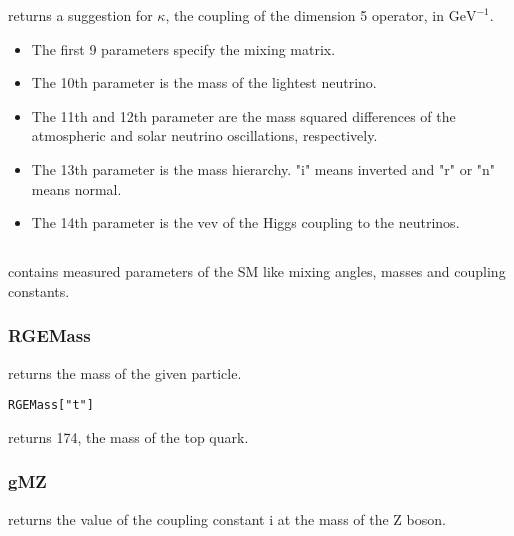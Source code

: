 \documentclass[10pt,a4paper,twoside]{scrartcl}
\begin{document}
 returns a suggestion for
    $\kappa$, the coupling of the dimension 5 operator, in
$\mathrm{GeV}^{-1}$.
\begin{itemize}
\item The first 9 parameters specify the mixing matrix.
\item The 10th parameter is the mass of the lightest neutrino.
\item The 11th and 12th parameter are the mass squared differences of the
atmospheric and solar neutrino oscillations, respectively.
\item The 13th parameter is the mass hierarchy. "i" means inverted and "r" or
"n" means normal.
\item The 14th parameter is the vev of the Higgs coupling
to the neutrinos.
\end{itemize}





\subsection[\package{RGEParameters}]{}
 contains measured parameters of the SM like mixing
angles, masses and coupling constants. %
  
\subsubsection{RGEMass}

 returns the mass of the given particle.

\begin{verbatim}
RGEMass["t"]
\end{verbatim}
returns 174, the mass of the top quark.


\subsubsection{gMZ}

 returns the value of the coupling constant i at the
mass of the Z boson.
\end{document}
